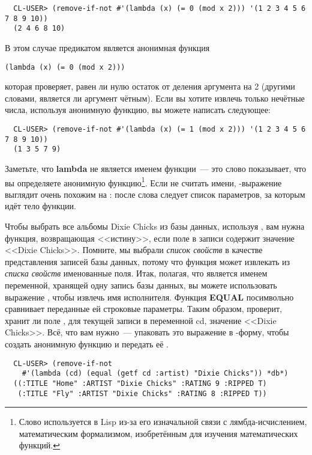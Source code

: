 \begin{verbatim}
  CL-USER> (remove-if-not #'(lambda (x) (= 0 (mod x 2))) '(1 2 3 4 5 6 7 8 9 10))
  (2 4 6 8 10)
\end{verbatim}

В этом случае предикатом является анонимная функция

\begin{lstlisting}
(lambda (x) (= 0 (mod x 2)))
\end{lstlisting}

которая проверяет, равен ли нулю остаток от деления аргумента на 2 (другими словами,
является ли аргумент чётным). Если вы хотите извлечь только нечётные числа, используя
анонимную функцию, вы можете написать следующее:

\begin{verbatim}
  CL-USER> (remove-if-not #'(lambda (x) (= 1 (mod x 2))) '(1 2 3 4 5 6 7 8 9 10))
  (1 3 5 7 9)
\end{verbatim}

Заметьте, что \textbf{lambda} не является именем функции~--- это слово показывает, что вы
определяете анонимную функцию\footnote{Слово  используется в Lisp из-за его
  изначальной связи с лямбда-исчислением, математическим формализмом, изобретённым для
  изучения математических функций.}. Если не считать имени, -выражение
выглядит очень похожим на : после слова  следует список
параметров, за которым идёт тело функции.

Чтобы выбрать все альбомы Dixie Chicks из базы данных, используя , вам
нужна функция, возвращающая <<истину>>, если поле в записи  содержит значение
<<Dixie Chicks>>. Помните, мы выбрали \textit{список свойств} в качестве представления
записей базы данных, потому что функция  может извлекать из \textit{списка
  свойств} именованные поля. Итак, полагая, что  является именем переменной,
хранящей одну запись базы данных, вы можете использовать выражение , чтобы извлечь имя исполнителя. Функция \textbf{EQUAL} посимвольно сравнивает
переданные ей строковые параметры. Таким образом,  проверит, хранит ли поле , для текущей записи в переменной cd,
значение <<Dixie Chicks>>. Всё, что вам нужно~--- упаковать это выражение в
-форму, чтобы создать анонимную функцию и передать её .

\begin{verbatim}
  CL-USER> (remove-if-not
    #'(lambda (cd) (equal (getf cd :artist) "Dixie Chicks")) *db*)
  ((:TITLE "Home" :ARTIST "Dixie Chicks" :RATING 9 :RIPPED T)
   (:TITLE "Fly" :ARTIST "Dixie Chicks" :RATING 8 :RIPPED T))
\end{verbatim}

